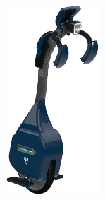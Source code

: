 \begin{cventries}
{\begin{minipage}{0.72\textwidth}
\begin{cvitems}
            \end{cvitems}
            \vspace{4mm}
            \vspace{5pt}
        \end{minipage}
        \hfill
        \begin{minipage}{0.25\textwidth}
            \vspace{5pt}
            \begin{center}
                \includegraphics[height=200pt]{img/Rimac/3.jpg}
            \end{center}
            \vspace{5pt}
        \end{minipage}
    }


\end{cventries}
